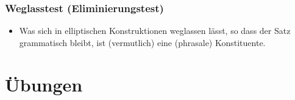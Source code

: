 \begin{frame}
\frametitle{Weglasstest (Eliminierungstest)}

\begin{itemize}
	\item Was sich in elliptischen Konstruktionen weglassen lässt, so dass der Satz grammatisch bleibt, ist (vermutlich) eine (phrasale) Konstituente.

	\eal 
	\eal

\end{itemize}

\end{frame}


\section{Übungen}

